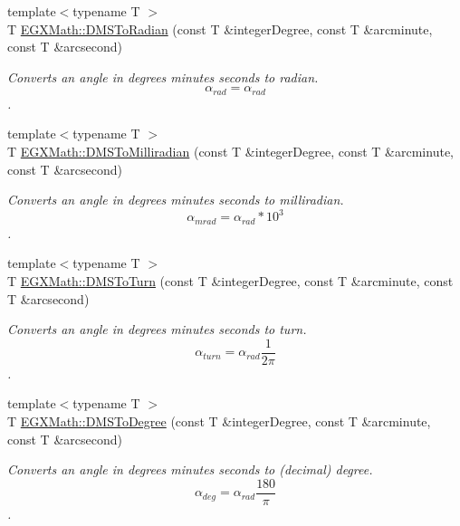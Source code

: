 \begin{DoxyCompactItemize}
\item 
{\footnotesize template$<$typename T $>$ }\\T \mbox{\hyperlink{group___e_g_x_math-_conversions-_angle_conversions-_d_m_s_gaf87ebf95727895ba81084a2246e93211}{E\+G\+X\+Math\+::\+D\+M\+S\+To\+Radian}} (const T \&integer\+Degree, const T \&arcminute, const T \&arcsecond)
\begin{DoxyCompactList}\small\item\em Converts an angle in degrees minutes seconds to radian. \[\alpha_{rad}=\alpha_{rad}\]. \end{DoxyCompactList}\item 
{\footnotesize template$<$typename T $>$ }\\T \mbox{\hyperlink{group___e_g_x_math-_conversions-_angle_conversions-_d_m_s_ga64258049da06b11e8ec77108ea80de82}{E\+G\+X\+Math\+::\+D\+M\+S\+To\+Milliradian}} (const T \&integer\+Degree, const T \&arcminute, const T \&arcsecond)
\begin{DoxyCompactList}\small\item\em Converts an angle in degrees minutes seconds to milliradian. \[\alpha_{mrad}=\alpha_{rad}*10^3\]. \end{DoxyCompactList}\item 
{\footnotesize template$<$typename T $>$ }\\T \mbox{\hyperlink{group___e_g_x_math-_conversions-_angle_conversions-_d_m_s_ga9ed22b7d1d3bafe2ee8e4c81510a77fa}{E\+G\+X\+Math\+::\+D\+M\+S\+To\+Turn}} (const T \&integer\+Degree, const T \&arcminute, const T \&arcsecond)
\begin{DoxyCompactList}\small\item\em Converts an angle in degrees minutes seconds to turn. \[\alpha_{turn}=\alpha_{rad}\frac{1}{2 \pi}\]. \end{DoxyCompactList}\item 
{\footnotesize template$<$typename T $>$ }\\T \mbox{\hyperlink{group___e_g_x_math-_conversions-_angle_conversions-_d_m_s_ga3744d5ef737f693a191efc151d8ef3f3}{E\+G\+X\+Math\+::\+D\+M\+S\+To\+Degree}} (const T \&integer\+Degree, const T \&arcminute, const T \&arcsecond)
\begin{DoxyCompactList}\small\item\em Converts an angle in degrees minutes seconds to (decimal) degree. \[\alpha_{deg}=\alpha_{rad}\frac{180}{\pi}\]. \end{DoxyCompactList}\item 

\end{DoxyCompactItemize}
